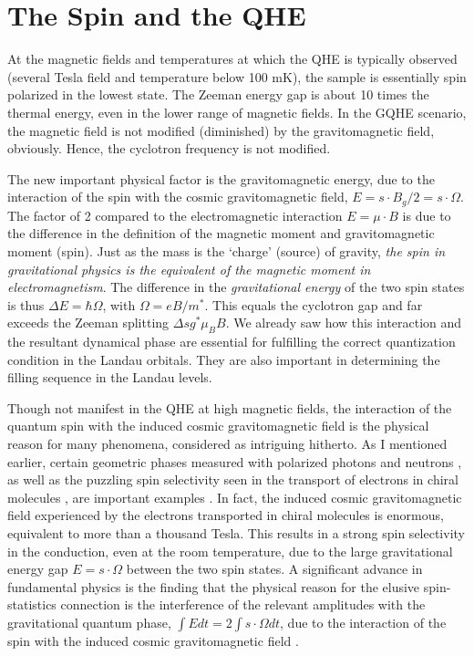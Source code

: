 \documentclass[aps,preprint,12pt,tightenlines]{revtex4}%
\begin{document}
\section{The Spin and the QHE}

At the magnetic fields and temperatures at which the QHE is typically observed
(several Tesla field and temperature below 100 mK), the sample is essentially
spin polarized in the lowest state. The Zeeman energy gap is about 10 times
the thermal energy, even in the lower range of magnetic fields. In the GQHE
scenario, the magnetic field is not modified (diminished) by the
gravitomagnetic field, obviously. Hence, the cyclotron frequency is not modified.

The new important physical factor is the gravitomagnetic energy, due to the
interaction of the spin with the cosmic gravitomagnetic field, $E=s\cdot
B_{g}/2=s\cdot\Omega$. The factor of 2 compared to the electromagnetic
interaction $E=\mu\cdot B$ is due to the difference in the definition of the
magnetic moment and gravitomagnetic moment (spin). Just as the mass is the
`charge' (source) of gravity, \emph{the spin in gravitational physics is the
equivalent of the magnetic moment in electromagnetism}. The difference in
the \emph{gravitational energy} of the two spin states is thus $\Delta
E=\hbar\Omega$, with $\Omega=eB/m^{\ast}$. This equals the cyclotron gap and
far exceeds the Zeeman splitting $\Delta sg^{\ast}\mu_{B}B$. We already saw
how this interaction and the resultant dynamical phase are essential for
fulfilling the correct quantization condition in the Landau orbitals. They are
also important in determining the filling sequence in the Landau levels.

Though not manifest in the QHE at high magnetic fields, the interaction of the
quantum spin with the induced cosmic gravitomagnetic field is the physical
reason for many phenomena, considered as intriguing hitherto. As I mentioned
earlier, certain geometric phases measured with polarized photons and neutrons
\cite{Tomita-Chiao,Neutron-geom-phase}, as well as the puzzling spin
selectivity seen in the transport of electrons in chiral molecules
\cite{Naaman}, are important examples \cite{Unni-NJP}. In fact, the induced cosmic gravitomagnetic field experienced by the electrons transported in chiral molecules is enormous, equivalent to more than a thousand Tesla. This results in a strong spin selectivity in the conduction, even at the room temperature, due to the large gravitational energy gap $E=s\cdot\Omega$ between the two spin states. A significant advance in fundamental physics is the finding that the physical reason for the elusive
spin-statistics connection is the interference of the relevant amplitudes with the gravitational quantum phase, $\int Edt=2\int s\cdot \Omega dt$, due to the interaction of the
spin with the induced cosmic gravitomagnetic field \cite{Unni-spinstat,Unni-PhysNews}.
\end{document}
